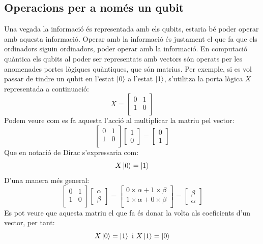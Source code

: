 \subsection{Operacions per a només un qubit}
\label{only_one_qubit}
Una vegada la informació és representada amb els qubits, estaria bé poder operar amb aquesta informació. Operar amb la informació és justament el que fa que els ordinadors siguin ordinadors, poder operar amb la informació. En computació quàntica els qubits al poder ser representats amb vectors són operats per les anomenades portes lògiques quàntiques, que són matrius. Per exemple, si es vol passar de tindre un qubit en l'estat $\ket{0}$ a l'estat $\ket{1}$, s'utilitza la porta lògica $X$ representada a continuació:
$$
X = \begin{bmatrix}
	0 & 1\\
	1 & 0\\
\end{bmatrix}
$$ 
Podem veure com es fa aquesta l'acció al multiplicar la matriu pel vector:
$$
\begin{bmatrix} 0 & 1\\ 1 & 0\\ \end{bmatrix} \begin{bmatrix}1 \\ 0 \end{bmatrix} = \begin{bmatrix}0 \\ 1 \end{bmatrix}
$$
Que en notació de Dirac s'expressaria com: 
$$
X\ket{0} = \ket{1}
$$
D'una manera més general: 
$$
\begin{bmatrix} 0 & 1\\ 1 & 0\\ \end{bmatrix} 
\begin{bmatrix}\alpha \\ \beta \end{bmatrix} =
\begin{bmatrix} 0\times\alpha + 1\times\beta \\1\times\alpha + 0\times\beta \\
\end{bmatrix}
= \begin{bmatrix} \beta \\ \alpha \end{bmatrix}
$$
Es pot veure que aquesta matriu el que fa és donar la volta als coeficients d'un vector, per tant:
$$
X\ket{0} = \ket{1} \text{ i } X\ket{1} = \ket{0}
$$

